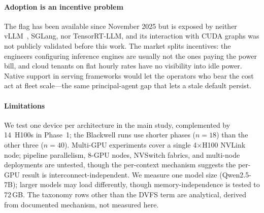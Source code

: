 \documentclass[conference]{IEEEtran}
\begin{document}
\paragraph{Adoption is an incentive problem}
The flag has been available since November 2025 but is exposed by neither vLLM~\cite{vllm}, SGLang, nor TensorRT-LLM, and its interaction with CUDA graphs was not publicly validated before this work. The market splits incentives: the engineers configuring inference engines are usually not the ones paying the power bill, and cloud tenants on flat hourly rates have no visibility into idle power. Native support in serving frameworks would let the operators who bear the cost act at fleet scale---the same principal-agent gap that lets a stale default persist.

\paragraph{Limitations}
We test one device per architecture in the main study, complemented by 14~H100s in Phase~1; the Blackwell runs use shorter phases ($n=18$) than the other three ($n=40$). Multi-GPU experiments cover a single 4$\times$H100 NVLink node; pipeline parallelism, 8-GPU nodes, NVSwitch fabrics, and multi-node deployments are untested, though the per-context mechanism suggests the per-GPU result is interconnect-independent. We measure one model size (Qwen2.5-7B); larger models may load differently, though memory-independence is tested to 72\,GB. The taxonomy rows other than the DVFS term are analytical, derived from documented mechanism, not measured here.

\end{document}

